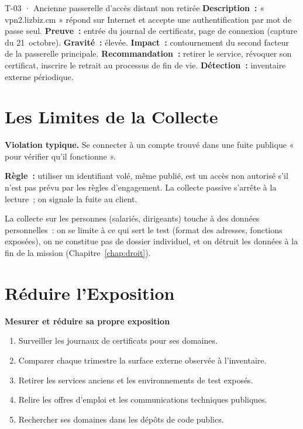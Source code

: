 \begin{boxobjet}{T-03 · Ancienne passerelle d'accès distant non retirée}
\textbf{Description~:} « vpn2.lizbiz.cm » répond sur Internet et accepte une
authentification par mot de passe seul. \textbf{Preuve~:} entrée du journal
de certificats, page de connexion (capture du 21~octobre).
\textbf{Gravité~:} élevée. \textbf{Impact~:} contournement du second facteur
de la passerelle principale. \textbf{Recommandation~:} retirer le service,
révoquer son certificat, inscrire le retrait au processus de fin de vie.
\textbf{Détection~:} inventaire externe périodique.
\end{boxobjet}

\section{Les Limites de la Collecte}
\label{sec:c05-limites}

\begin{boxalert}
\textbf{Violation typique.} Se connecter à un compte trouvé dans une fuite
publique « pour vérifier qu'il fonctionne ».

\smallskip
\textbf{Règle~:} utiliser un identifiant volé, même publié, est un accès
non autorisé s'il n'est pas prévu par les règles d'engagement. La collecte
passive s'arrête à la lecture~; on signale la fuite au client.
\end{boxalert}

La collecte sur les personnes (salariés, dirigeants) touche à des données
personnelles~: on se limite à ce qui sert le test (format des adresses,
fonctions exposées), on ne constitue pas de dossier individuel, et on
détruit les données à la fin de la mission (Chapitre~\ref{chap:droit}).

\section{Réduire l'Exposition}
\label{sec:c05-reduire}

\begin{boxprocedure}
\textbf{Mesurer et réduire sa propre exposition}
\begin{enumerate}
    \item Surveiller les journaux de certificats pour ses domaines.
    \item Comparer chaque trimestre la surface externe observée à
          l'inventaire.
    \item Retirer les services anciens et les environnements de test exposés.
    \item Relire les offres d'emploi et les communications techniques
          publiques.
    \item Rechercher ses domaines dans les dépôts de code publics.
\end{enumerate}
\end{boxprocedure}

